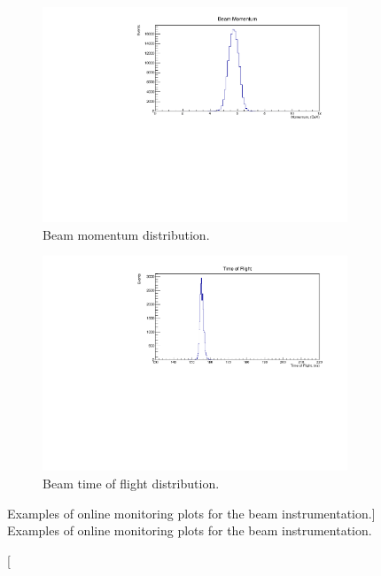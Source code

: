 \begin{figure}

	\centering

	\begin{subfigure}[b]{0.8\textwidth}
		\centering
		\vspace{3mm}
		\includegraphics[width=\textwidth]{figures/beam_momentum_om.pdf}
		\caption {Beam momentum distribution.}
		\label{fig:beam_momentum_om}
	\end{subfigure}

	\begin{subfigure}[b]{0.8\textwidth}
		\centering
		\vspace{3mm}
		\includegraphics[width=\textwidth]{figures/beam_tof_om.pdf}
		\caption {Beam time of flight distribution.}
		\label{fig:beam_tof_om}
	\end{subfigure}

	\caption
	[Examples of online monitoring plots for the beam instrumentation.]
	{Examples of online monitoring plots for the beam instrumentation.}
	\label{fig:beam_OM}

\end{figure}

